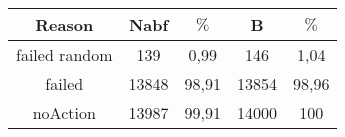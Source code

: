 \documentclass{article}
\begin{document}
\begin{tabular}{|c||c|c||c|c|}
\hline
Reason&Nabf& $\%$&B& $\%$\\
\hline
failed random&139&0,99&146&1,04\\

failed&13848&98,91&13854&98,96\\

noAction&13987&99,91&14000&100\\
\hline
\end{tabular}
\end{document}
